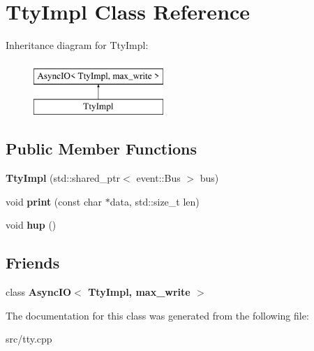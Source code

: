 \hypertarget{classTtyImpl}{}\section{Tty\+Impl Class Reference}
\label{classTtyImpl}
Inheritance diagram for Tty\+Impl\+:\begin{figure}[H]
\begin{center}
\leavevmode
\includegraphics[height=2.000000cm]{classTtyImpl}
\end{center}
\end{figure}
\subsection*{Public Member Functions}
\begin{DoxyCompactItemize}
\item 
\mbox{\label{classTtyImpl_a9a11cd325a5329aa5e75d5f530a31c15}} 
{\bfseries Tty\+Impl} (std\+::shared\+\_\+ptr$<$ event\+::\+Bus $>$ bus)
\item 
\mbox{\label{classTtyImpl_a1c4eee64f7031999a002658e347700a2}} 
void {\bfseries print} (const char $\ast$data, std\+::size\+\_\+t len)
\item 
\mbox{\label{classTtyImpl_aa6d4ebb233b963e32e010d47461905f4}} 
void {\bfseries hup} ()
\end{DoxyCompactItemize}
\subsection*{Friends}
\begin{DoxyCompactItemize}
\item 
\mbox{\label{classTtyImpl_ac07d904a769e411de0b805d3578101bc}} 
class {\bfseries Async\+I\+O$<$ Tty\+Impl, max\+\_\+write $>$}
\end{DoxyCompactItemize}


The documentation for this class was generated from the following file\+:\begin{DoxyCompactItemize}
\item 
src/tty.\+cpp\end{DoxyCompactItemize}
